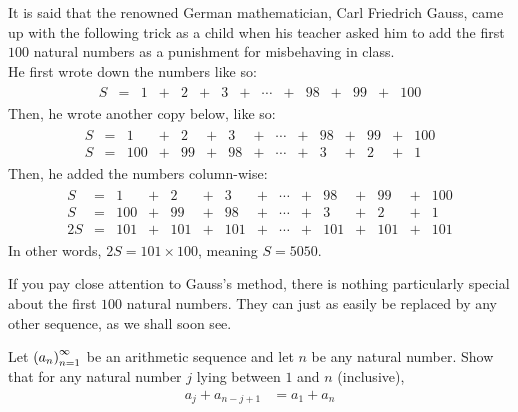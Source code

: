 \begin{boxexample}[Gauss] \label{eg:Gauss_sum}
    It is said that the renowned German mathematician, Carl Friedrich Gauss, came up with the following trick as a child when his teacher asked him to add the first $100$ natural numbers as a punishment for misbehaving in class. \\

    He first wrote down the numbers like so:
    \begin{align*}
        \begin{matrix}
            S & = & 1 & + & 2 & + & 3 & + & \cdots & + & 98 & + & 99 & + & 100
        \end{matrix}
    \end{align*}
    Then, he wrote another copy below, like so:
    \begin{align*}
        \begin{matrix}
            S & = & 1 & + & 2 & + & 3 & + & \cdots & + & 98 & + & 99 & + & 100 \\
            S & = & 100 & + & 99 & + & 98 & + & \cdots & + & 3 & + & 2 & + & 1
        \end{matrix}
    \end{align*}
    Then, he added the numbers column-wise:
    \begin{align*}
        \begin{matrix}
            S & = & 1 & + & 2 & + & 3 & + & \cdots & + & 98 & + & 99 & + & 100 \\
            S & = & 100 & + & 99 & + & 98 & + & \cdots & + & 3 & + & 2 & + & 1 \\
            \hline
            2S & = & 101 & + & 101 & + & 101 & + & \cdots & + & 101 & + & 101 & + & 101
        \end{matrix}
    \end{align*}
    In other words, $2S = 101 \times 100$, meaning $S = 5050$.
\end{boxexample}
If you pay close attention to Gauss's method, there is nothing particularly special about the first $100$ natural numbers. They can just as easily be replaced by any other sequence, as we shall soon see.

\begin{boxexercise}\label{ex:AS_first_pl_last}
    Let $\left( a_n \right)_{n=1}^{\infty}$ be an arithmetic sequence and let $n$ be any natural number. Show that for any natural number $j$ lying between $1$ and $n$ (inclusive),
    \begin{align}
        a_j + a_{n-j+1} &= a_1 + a_n \label{eq:AS_first_pl_last}
    \end{align}
\end{boxexercise}

